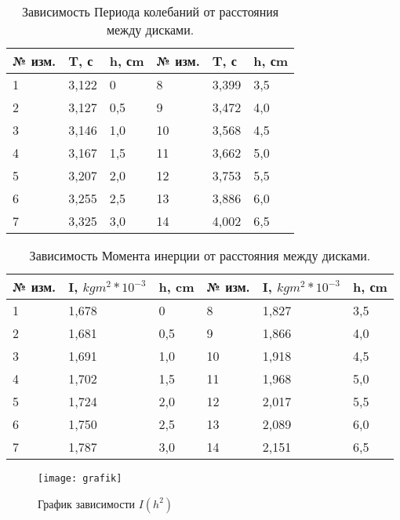 \documentclass[12pt,a4paper]{article}
\begin{document}
		
		\begin{table}[b]
			\begin{center}
				\begin{tabular}{| l | l | l || l | l | l |}
					\hline
					№ изм. & T, с & h, сm & № изм. & T, с & h, сm \\ \hline
					1 & 3,122 & 0 & 8 & 3,399 & 3,5 \\ \hline
					2 & 3,127 & 0,5 & 9 & 3,472 & 4,0 \\ \hline
					3 & 3,146 & 1,0 & 10 & 3,568 & 4,5 \\ \hline
					4 & 3,167 & 1,5 & 11 & 3,662 & 5,0 \\ \hline
					5 & 3,207 & 2,0 & 12 & 3,753 & 5,5 \\ \hline
					6 & 3,255 & 2,5 & 13 & 3,886 & 6,0 \\ \hline
					7 & 3,325 & 3,0 & 14 & 4,002 & 6,5 \\ \hline
				\end{tabular}
				\caption{Зависимость Периода колебаний от расстояния между дисками.}
				\label{tab:period}
			\end{center}
		\end{table}
		
		\begin{table}[t]
			\begin{center}
				\begin{tabular}{| l | l | l || l | l | l |}
					\hline
					№ изм. & I, $kgm^2 * 10^{-3}$ & h, cm & № изм. & I, $kgm^2 * 10^{-3}$ & h, сm \\ \hline
					1 & 1,678 & 0 & 8 & 1,827 & 3,5 \\ \hline
					2 & 1,681 & 0,5 & 9 & 1,866 & 4,0 \\ \hline
					3 & 1,691 & 1,0 & 10 & 1,918 & 4,5 \\ \hline
					4 & 1,702 & 1,5 & 11 & 1,968 & 5,0 \\ \hline
					5 & 1,724 & 2,0 & 12 & 2,017 & 5,5 \\ \hline
					6 & 1,750 & 2,5 & 13 & 2,089 & 6,0 \\ \hline
					7 & 1,787 & 3,0 & 14 & 2,151 & 6,5 \\ \hline
				\end{tabular}
				\caption{Зависимость Момента инерции от расстояния между дисками.}
				\label{tab:moment}
			\end{center}
		\end{table}

		\begin{figure}
		

			\begin{center}
				\texttt{[image: grafik]}
				\caption{График зависимости $ I(h^2) $}
				\label{ris:grafik}
			\end{center}
		\end{figure}
\end{document}
